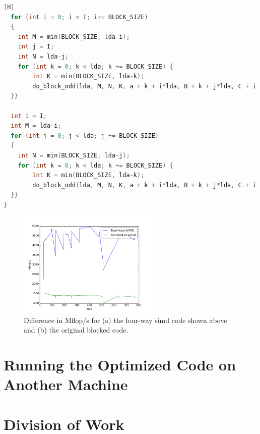 \documentclass[10pt]{article}
\begin{document}
\begin{lstlisting}[language=C, basicstyle=\small][H]
  for (int i = 0; i < I; i+= BLOCK_SIZE)
  {
    int M = min(BLOCK_SIZE, lda-i);
    int j = I;
    int N = lda-j;
    for (int k = 0; k < lda; k += BLOCK_SIZE) {
        int K = min(BLOCK_SIZE, lda-k);
        do_block_odd(lda, M, N, K, a + k + i*lda, B + k + j*lda, C + i + j*lda);
  }}

  int i = I;
  int M = lda-i;
  for (int j = 0; j < lda; j += BLOCK_SIZE)
  {
    int N = min(BLOCK_SIZE, lda-j);
    for (int k = 0; k < lda; k += BLOCK_SIZE) {
        int K = min(BLOCK_SIZE, lda-k);
        do_block_odd(lda, M, N, K, a + k + i*lda, B + k + j*lda, C + i + j*lda);
  }}
}
\end{lstlisting}

\begin{figure}[H]
\centering
\includegraphics[width=0.6\textwidth]{figures/four-way-simd.png}
\caption{Difference in Mflop/s for (a) the four-way \gls{simd} code shown above and (b) the original blocked code.}
\label{fig:4}
\end{figure}

\section{Running the Optimized Code on Another Machine}

\section{Division of Work}
\end{document}
